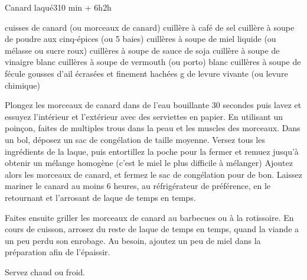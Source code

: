 \begin{recette}{Canard laqué}{3}{10 min + 6h}{2h}

\begin{ingredients}
 cuisses de canard (ou morceaux de canard)
 cuillère à café de sel
 cuillère à soupe de poudre aux cinq-épices (ou 5 baies)
 cuillères à soupe de miel liquide (ou mélasse ou sucre roux)
 cuillères à soupe de sauce de soja
 cuillère à soupe de vinaigre blanc
 cuillères à soupe de vermouth (ou porto) blanc
 cuillères à soupe de fécule
 gousses d'ail écrasées et finement hachées
 g de levure vivante (ou levure chimique)
\end{ingredients}

\begin{preparation}
\etape Plongez les morceaux de canard dans de l'eau bouillante 30 secondes puis lavez et essuyez l'intérieur et l'extérieur avec des serviettes en papier.
\etape En utilisant un poinçon, faites de multiples trous dans la peau et les muscles des morceaux.
\etape Dans un bol, déposez un sac de congélation de taille moyenne. Versez tous les ingrédients de la laque, puis entortillez la poche pour la fermer et remuez jusqu'à obtenir un mélange homogène (c'est le miel le plus difficile à mélanger)
\etape Ajoutez alors les morceaux de canard, et fermez le sac de congélation pour de bon.
\etape Laissez mariner le canard au moins 6 heures, au réfrigérateur de préférence, en le retournant et l'arrosant de laque de temps en temps.
\end{preparation}

\begin{cuisson}
Faites ensuite griller les morceaux de canard au barbecues ou à la rotissoire. En cours de cuisson, arrosez du reste de laque de temps en temps, quand la viande a un peu perdu son enrobage. Au besoin, ajoutez un peu de miel dans la préparation afin de l'épaissir.

Servez chaud ou froid.
\end{cuisson}
\end{recette}

